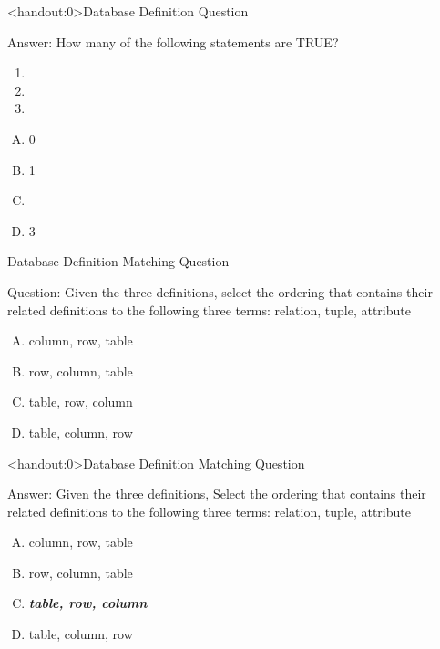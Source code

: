 \documentclass[xcolor=svgnames]{beamer}
\newcommand{\answer}[1]{\textit{\textbf{\textcolor{iyellow}{#1}}}}
\theoremstyle{example}
\begin{document}
\begin{frame}<handout:0>{Database Definition Question}
\begin{block}
{Answer:}
 How many of the following statements are TRUE?
\begin{enumerate}
\item  {}
\item  {}
\item {}
\end{enumerate}
\begin{multicols}{4}
\begin{enumerate}[A)]
\item 0 
\item 1
\item \textbf<3>{\textit<3>{{}}}
\item 3
\end{enumerate}
\end{multicols}
\end{block}
\end{frame}




\begin{frame}{Database Definition Matching Question}
\begin{exampleblock}{Question: }
Given the three definitions, select the ordering that contains their related definitions to the following three terms: relation, tuple, attribute
\begin{enumerate}[A)]
\item  column, row, table
\item  row, column, table
\item  table, row, column
\item table, column, row
\end{enumerate}
\end{exampleblock}
\end{frame}

\begin{frame}<handout:0>{Database Definition Matching Question}
\begin{block}{Answer: }
Given the three definitions, 
Select the ordering that contains their related definitions to the following three terms: relation, tuple, attribute
\begin{enumerate}[A)]
\item  column, row, table
\item  row, column, table
\item  \answer{table, row, column}
\item table, column, row
\end{enumerate}
\end{block}
\end{frame}
\end{document}
